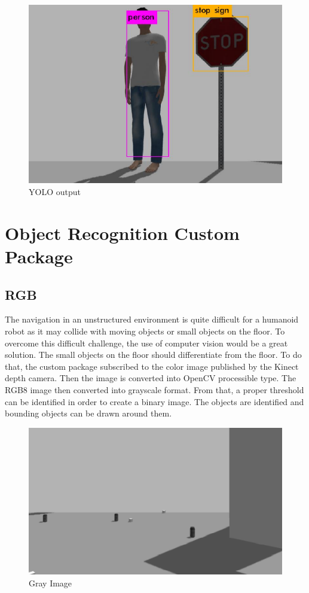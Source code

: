 \documentclass[twoside,12pt,times,onecolumn,a4paper]{report}
\begin{document}
\begin{figure}[H]
  \centering
   \includegraphics[width=12cm]{yolo}
  \caption{YOLO output}
\end{figure}

\section{Object Recognition Custom Package}

\subsection{RGB}

The navigation in an unstructured environment is quite difficult for a humanoid robot 
as it may collide with moving objects or small objects on the floor. To overcome this 
difficult challenge, the use of computer vision would be a great solution. 
The small objects on the floor should differentiate from the floor. To do that, the 
custom package subscribed to the color image published by the Kinect depth camera. 
Then the image is converted into OpenCV processible type. The RGB8 image then 
converted into grayscale format. From that, a proper threshold can be identified in order to 
create a binary image. The objects are identified and bounding objects can be drawn 
around them.

\begin{figure}[H]
  \centering
   \includegraphics[width=15cm]{gray}
  \caption{Gray Image}
\end{figure}
\end{document}
